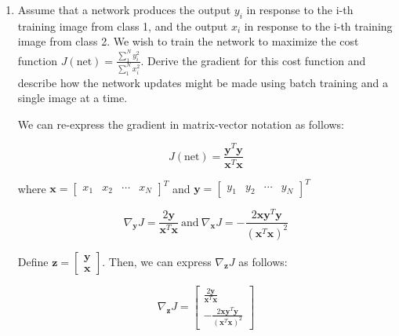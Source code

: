 \documentclass[fleqn]{article}
\begin{document}
\begin{enumerate}
		\item Assume that a network produces the output $y_i$ in response to the i-th training image from class 1, and the output $x_i$ in response to the i-th training image from class 2. We wish to train the network to maximize the cost function $J(\text{net}) = \frac{\sum_{1}^{N}{y_i^2}}{\sum_{1}^{N}{x_i^2}}$. Derive the gradient for this cost function and describe how the network updates might be made using batch training and a single image at a time.
		
		We can re-express the gradient in matrix-vector notation as follows:
		
		\begin{equation*}
			J(\text{net}) = \frac{\mathbf{y}^T\mathbf{y}}{\mathbf{x}^T\mathbf{x}}
		\end{equation*}
		
		where $\mathbf{x} = \begin{bmatrix}x_1 & x_2 & \cdots & x_N \end{bmatrix}^T$ and $\mathbf{y} = \begin{bmatrix}y_1 & y_2 & \cdots & y_N \end{bmatrix}^T$
		
		\begin{equation*}
			\nabla_{\mathbf{y}}{J} = \frac{2\mathbf{y}}{\mathbf{x}^T\mathbf{x}} \ \text{and}\ \nabla_{\mathbf{x}}{J} = -\frac{2\mathbf{x}\mathbf{y}^T\mathbf{y}}{(\mathbf{x}^T\mathbf{x})^2}
		\end{equation*}
		
		Define $\mathbf{z} = \begin{bmatrix} \mathbf{y} \\ \mathbf{x} \end{bmatrix}$. Then, we can express $\nabla_{\mathbf{z}}{J}$ as follows:
		
		\begin{equation*}
			\nabla_{\mathbf{z}}{J} = \begin{bmatrix}
				\frac{2\mathbf{y}}{\mathbf{x}^T\mathbf{x}} \\[3pt]
				-\frac{2\mathbf{x}\mathbf{y}^T\mathbf{y}}{(\mathbf{x}^T\mathbf{x})^2}
			\end{bmatrix}
		\end{equation*}
	\end{enumerate}
\end{document}
